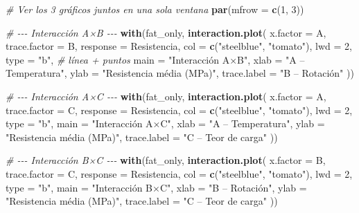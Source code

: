 \documentclass[
]{article}
\newenvironment{Shaded}{\begin{snugshade}}{\end{snugshade}}
\newcommand{\AttributeTok}[1]{\textcolor[rgb]{0.13,0.29,0.53}{#1}}
\newcommand{\CommentTok}[1]{\textcolor[rgb]{0.56,0.35,0.01}{\textit{#1}}}
\newcommand{\DecValTok}[1]{\textcolor[rgb]{0.00,0.00,0.81}{#1}}
\newcommand{\FunctionTok}[1]{\textcolor[rgb]{0.13,0.29,0.53}{\textbf{#1}}}
\newcommand{\NormalTok}[1]{#1}
\newcommand{\StringTok}[1]{\textcolor[rgb]{0.31,0.60,0.02}{#1}}
\begin{document}
\begin{Shaded}
\begin{Highlighting}[]
\CommentTok{\# Ver los 3 gráficos juntos en una sola ventana}
\FunctionTok{par}\NormalTok{(}\AttributeTok{mfrow =} \FunctionTok{c}\NormalTok{(}\DecValTok{1}\NormalTok{, }\DecValTok{3}\NormalTok{))}

\CommentTok{\# {-}{-}{-} Interacción A×B {-}{-}{-}}
\FunctionTok{with}\NormalTok{(fat\_only,}
     \FunctionTok{interaction.plot}\NormalTok{(}
       \AttributeTok{x.factor     =}\NormalTok{ A,}
       \AttributeTok{trace.factor  =}\NormalTok{ B,}
       \AttributeTok{response      =}\NormalTok{ Resistencia,}
       \AttributeTok{col           =} \FunctionTok{c}\NormalTok{(}\StringTok{"steelblue"}\NormalTok{, }\StringTok{"tomato"}\NormalTok{),}
       \AttributeTok{lwd           =} \DecValTok{2}\NormalTok{,}
       \AttributeTok{type          =} \StringTok{"b"}\NormalTok{,          }\CommentTok{\# línea + puntos}
       \AttributeTok{main          =} \StringTok{"Interacción A×B"}\NormalTok{,}
       \AttributeTok{xlab          =} \StringTok{"A – Temperatura"}\NormalTok{,}
       \AttributeTok{ylab          =} \StringTok{"Resistencia média (MPa)"}\NormalTok{,}
       \AttributeTok{trace.label   =} \StringTok{"B – Rotación"}
\NormalTok{     ))}

\CommentTok{\# {-}{-}{-} Interacción A×C {-}{-}{-}}
\FunctionTok{with}\NormalTok{(fat\_only,}
     \FunctionTok{interaction.plot}\NormalTok{(}
       \AttributeTok{x.factor     =}\NormalTok{ A,}
       \AttributeTok{trace.factor  =}\NormalTok{ C,}
       \AttributeTok{response      =}\NormalTok{ Resistencia,}
       \AttributeTok{col           =} \FunctionTok{c}\NormalTok{(}\StringTok{"steelblue"}\NormalTok{, }\StringTok{"tomato"}\NormalTok{),}
       \AttributeTok{lwd           =} \DecValTok{2}\NormalTok{,}
       \AttributeTok{type          =} \StringTok{"b"}\NormalTok{,}
       \AttributeTok{main          =} \StringTok{"Interacción A×C"}\NormalTok{,}
       \AttributeTok{xlab          =} \StringTok{"A – Temperatura"}\NormalTok{,}
       \AttributeTok{ylab          =} \StringTok{"Resistencia média (MPa)"}\NormalTok{,}
       \AttributeTok{trace.label   =} \StringTok{"C – Teor de carga"}
\NormalTok{     ))}

\CommentTok{\# {-}{-}{-} Interacción B×C {-}{-}{-}}
\FunctionTok{with}\NormalTok{(fat\_only,}
     \FunctionTok{interaction.plot}\NormalTok{(}
       \AttributeTok{x.factor     =}\NormalTok{ B,}
       \AttributeTok{trace.factor  =}\NormalTok{ C,}
       \AttributeTok{response      =}\NormalTok{ Resistencia,}
       \AttributeTok{col           =} \FunctionTok{c}\NormalTok{(}\StringTok{"steelblue"}\NormalTok{, }\StringTok{"tomato"}\NormalTok{),}
       \AttributeTok{lwd           =} \DecValTok{2}\NormalTok{,}
       \AttributeTok{type          =} \StringTok{"b"}\NormalTok{,}
       \AttributeTok{main          =} \StringTok{"Interacción B×C"}\NormalTok{,}
       \AttributeTok{xlab          =} \StringTok{"B – Rotación"}\NormalTok{,}
       \AttributeTok{ylab          =} \StringTok{"Resistencia média (MPa)"}\NormalTok{,}
       \AttributeTok{trace.label   =} \StringTok{"C – Teor de carga"}
\NormalTok{     ))}
\end{Highlighting}
\end{Shaded}
\end{document}
